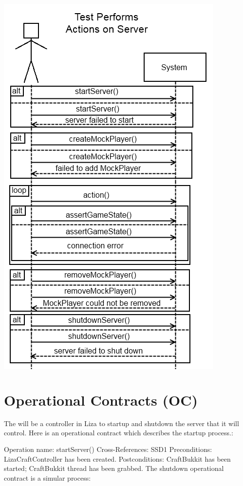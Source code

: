 \documentclass{article}
\begin{document}
\includegraphics{ssd}

\section{Operational Contracts (OC)}

The will be a controller in Liza to startup and shutdown the server that it will control.
 Here is an operational contract which describes the startup process.:  \newline

Operation name: startServer() 
\newline \indent
Cross-References: SSD1 
\newline  \indent
Preconditions: LizaCraftController has been created.
\newline  \indent
Postconditions: CraftBukkit has been started; CraftBukkit thread has been \indent grabbed.
 \newline \newline
The shutdown operational contract is a simular process: \newline
\end{document}
